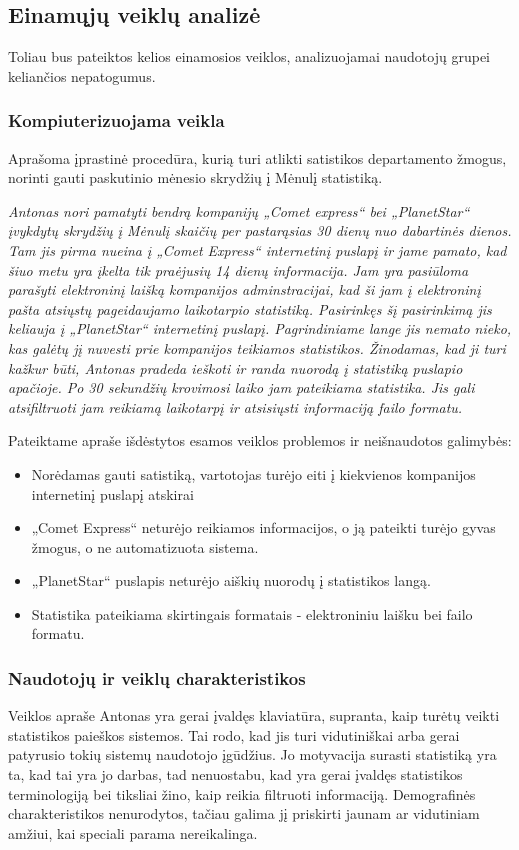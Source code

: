 \documentclass{VUMIFPSkursinis}
\begin{document}
\subsection{Einamųjų veiklų analizė}
Toliau bus pateiktos kelios einamosios veiklos, analizuojamai naudotojų grupei keliančios nepatogumus.

\subsubsection{Kompiuterizuojama veikla}
Aprašoma įprastinė procedūra, kurią turi atlikti satistikos departamento žmogus, norinti gauti paskutinio mėnesio skrydžių į Mėnulį statistiką.

\bigskip
\textit{Antonas nori pamatyti bendrą kompanijų „Comet express“ bei „PlanetStar“ įvykdytų skrydžių į Mėnulį skaičių per pastarąsias 30 dienų nuo dabartinės dienos. Tam jis pirma nueina į „Comet Express“ internetinį puslapį ir jame pamato, kad šiuo metu yra įkelta tik praėjusių 14 dienų informacija. Jam yra pasiūloma parašyti elektroninį laišką kompanijos adminstracijai, kad ši jam į elektroninį pašta atsiųstų pageidaujamo laikotarpio statistiką. Pasirinkęs šį pasirinkimą jis keliauja į „PlanetStar“ internetinį puslapį. Pagrindiniame lange jis nemato nieko, kas galėtų jį nuvesti prie kompanijos teikiamos statistikos. Žinodamas, kad ji turi kažkur būti, Antonas pradeda ieškoti ir randa nuorodą į statistiką puslapio apačioje. Po 30 sekundžių krovimosi laiko jam pateikiama statistika. Jis gali atsifiltruoti jam reikiamą laikotarpį ir atsisiųsti informaciją failo formatu.}

\bigskip
Pateiktame apraše išdėstytos esamos veiklos problemos ir neišnaudotos galimybės:  
\begin{itemize}
\item Norėdamas gauti satistiką, vartotojas turėjo eiti į kiekvienos kompanijos internetinį puslapį atskirai
\item „Comet Express“ neturėjo reikiamos informacijos, o ją pateikti turėjo gyvas žmogus, o ne automatizuota sistema.
\item „PlanetStar“ puslapis neturėjo aiškių nuorodų į statistikos langą.
\item Statistika pateikiama skirtingais formatais - elektroniniu laišku bei failo formatu.
\end{itemize}

\subsubsection{Naudotojų ir veiklų charakteristikos}
Veiklos apraše Antonas yra gerai įvaldęs klaviatūra, supranta, kaip turėtų veikti statistikos paieškos sistemos. Tai rodo, kad jis turi vidutiniškai arba gerai patyrusio tokių sistemų naudotojo įgūdžius. Jo motyvacija surasti statistiką yra ta, kad tai yra jo darbas, tad nenuostabu, kad yra gerai įvaldęs statistikos terminologiją bei tiksliai žino, kaip reikia filtruoti informaciją. Demografinės charakteristikos nenurodytos, tačiau galima jį priskirti jaunam ar vidutiniam amžiui, kai speciali parama nereikalinga. 
\end{document}
